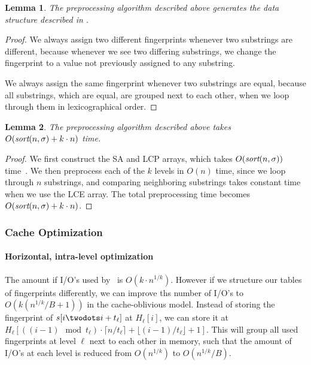 \documentclass[a4]{article}
\newcommand*{\pref}{\prettyref}
\newtheorem{lemma}{Lemma}
\begin{document}
\begin{lemma}
The preprocessing algorithm described above generates the data structure described in \pref{sec:fingerprint-ds}.
\end{lemma}

\begin{proof}
We always assign two different fingerprints whenever two substrings are different, because whenever we see two differing substrings, we change the fingerprint to a value not previously assigned to any substring.

We always assign the same fingerprint whenever two substrings are equal, because all substrings, which are equal, are grouped next to each other, when we loop through them in lexicographical order.
\end{proof}

\begin{lemma}
The preprocessing algorithm described above takes $O(\textit{sort}(n,\sigma) + k\cdot n)$ time.
\end{lemma}

\begin{proof}
We first construct the SA and LCP arrays, which takes $O(\textit{sort}(n,\sigma))$ time~\cite{sort-complexity}. We then preprocess each of the $k$ levels in $O(n)$ time, since we loop through $n$ substrings, and comparing neighboring substrings takes constant time when we use the LCE array. The total preprocessing time becomes $O(\textit{sort}(n,\sigma) + k\cdot n)$.
\end{proof}

\ifreport

\subsubsection{Cache Optimization\label{sec:fingerprint-cache}}

\paragraph{Horizontal, intra-level optimization}

The amount if I/O's used by \fprintk\ is $O(k\cdot n^{1/k})$. However if we structure our tables of fingerprints differently, we can improve ths number of I/O's to $O(k(n^{1/k}/B+1))$ in the cache-oblivious model. Instead of storing the fingerprint of $s[i\twodots i+t_\ell]$ at $H_\ell[i]$, we can store it at $H_\ell[((i-1)\mod t_\ell)\cdot\lceil n/t_\ell\rceil+\lfloor (i-1)/t_\ell\rfloor+1]$. This will group all used fingerprints at level $\ell$ next to each other in memory, such that the amount of I/O's at each level is reduced from $O(n^{1/k})$ to $O(n^{1/k}/B)$.
\end{document}
